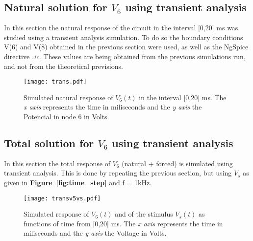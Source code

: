 \subsection{ Natural solution for $V_6$ using transient analysis}
In this section the natural response of the circuit in the interval [0,20] ms was studied using a transient analysis simulation. To do so the boundary conditions V(6) and V(8) obtained in the previous section were used, as well as the NgSpice directive \textit{.ic}. These values are being obtained from the previous simulations run, and not from the theoretical previsions. 
\par
\begin{figure}[H] \centering
\texttt{[image: trans.pdf]}
\caption{Simulated natural response of $V_6(t)$ in the interval [0,20] ms. The \textit{x axis} represents the time in miliseconds and the \textit{y axis} the Potencial in node 6  in Volts.  }
\label{fig:transient}
\end{figure}

\pagebreak
\subsection{ Total solution for $V_6$ using transient analysis}

In this section the total response of $V_6$ (natural + forced) is simulated using transient analysis. This is done by repeating the previous section, but using {\it $V_s$} as given in \textbf{Figure~\ref{fig:time_step}} and f = 1kHz.\par
\begin{figure}[H] \centering
\texttt{[image: transv5vs.pdf]}
\caption{Simulated response of $V_{6}(t)$ and of the stimulus $V_{s}(t)$ as functions of time from [0,20] ms. The \textit{x axis} represents the time in miliseconds and the \textit{y axis} the Voltage in Volts.}
\label{fig:resp_total}
\end{figure}

\pagebreak
